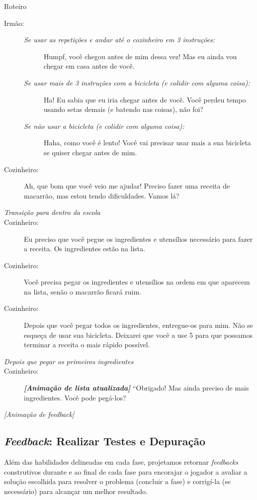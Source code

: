 \begin{description}
	\item Roteiro
    \begin{description}
    	\item[Irmão:]
        \begin{description}
        	\item[]
            \item[\textit{Se usar as repetições e andar até o cozinheiro em 3 instruções:}] Humpf, você chegou antes de mim dessa vez! Mas eu ainda vou chegar em casa antes de você.
            \item[\textit{Se usar mais de 3 instruções com a bicicleta (e colidir com alguma coisa):}] Ha! Eu sabia que eu iria chegar antes de você. Você perdeu tempo usando setas demais (e batendo nas coisas), não foi?
			\item[\textit{Se não usar a bicicleta (e colidir com alguma coisa):}] Haha, como você é lento! Você vai precisar usar mais a sua bicicleta se quiser chegar antes de mim.
        \end{description}
        \item[Cozinheiro:] Ah, que bom que você veio me ajudar! Preciso fazer uma receita de macarrão, mas estou tendo dificuldades. Vamos lá?
        \item[\textit{Transição para dentro da escola}]
		\item[Cozinheiro:] Eu preciso que você pegue os ingredientes e utensílios necessário para fazer a receita. Os ingredientes estão na lista.
		\item[Cozinheiro:] Você precisa pegar os ingredientes e utensílios na ordem em que aparecem na lista, senão o macarrão ficará ruim.
		\item[Cozinheiro:] Depois que você pegar todos os ingredientes, entregue-os para mim. Não se esqueça de usar sua bicicleta. Deixarei que você a use 5 para que possamos terminar a receita o mais rápido possível.
        \item[\textit{Depois que pegar os primeiros ingredientes}] \item[Cozinheiro:] \textbf{\textit{[Animação de lista atualizada]}} “Obrigado! Mas ainda preciso de mais ingredientes. Você pode pegá-los?
        \item[\textit{[Animação de feedback]}]
    \end{description}
\end{description}

\subsection{\textit{Feedback}: Realizar Testes e Depuração} \label{ssec:feedback}

Além das habilidades delineadas em cada fase, projetamos retornar \textit{feedbacks} construtivos durante e ao final de cada fase para encorajar o jogador a avaliar a solução escolhida para resolver o problema (concluir a fase) e corrigí-la (se necessário) para alcançar um melhor resultado.
